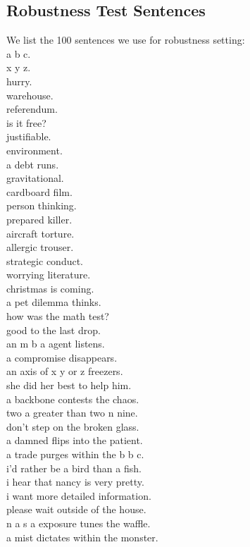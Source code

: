 \documentclass{article}
\begin{document}
\subsection{Robustness Test Sentences}
\label{sec:robustnesssentences}
We list the 100 sentences we use for robustness setting:\\
a b c.\\
x y z.\\
hurry.\\
warehouse.\\
referendum.\\
is it free?\\
justifiable.\\
environment.\\
a debt runs.\\
gravitational.\\
cardboard film.\\
person thinking.\\
prepared killer.\\
aircraft torture.\\
allergic trouser.\\
strategic conduct.\\
worrying literature.\\
christmas is coming.\\
a pet dilemma thinks.\\
how was the math test?\\
good to the last drop.\\
an m b a agent listens.\\
a compromise disappears.\\
an axis of x y or z freezers.\\
she did her best to help him.\\
a backbone contests the chaos.\\
two a greater than two n nine.\\
don't step on the broken glass.\\
a damned flips into the patient.\\
a trade purges within the b b c.\\
i'd rather be a bird than a fish.\\
i hear that nancy is very pretty.\\
i want more detailed information.\\
please wait outside of the house.\\
n a s a exposure tunes the waffle.\\
a mist dictates within the monster.\\
\end{document}
